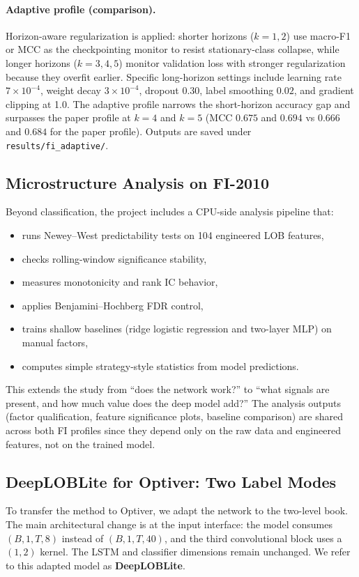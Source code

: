 \documentclass[11pt]{article}
\begin{document}
\paragraph{Adaptive profile (comparison).} Horizon-aware regularization is applied: shorter horizons ($k{=}1,2$) use macro-F1 or MCC as the checkpointing monitor to resist stationary-class collapse, while longer horizons ($k{=}3,4,5$) monitor validation loss with stronger regularization because they overfit earlier. Specific long-horizon settings include learning rate $7\times10^{-4}$, weight decay $3\times10^{-4}$, dropout $0.30$, label smoothing $0.02$, and gradient clipping at 1.0. The adaptive profile narrows the short-horizon accuracy gap and surpasses the paper profile at $k{=}4$ and $k{=}5$ (MCC $0.675$ and $0.694$ vs $0.666$ and $0.684$ for the paper profile). Outputs are saved under \texttt{results/fi\_adaptive/}.

\subsection{Microstructure Analysis on FI-2010}
Beyond classification, the project includes a CPU-side analysis pipeline that:
\begin{itemize}[leftmargin=*]
    \item runs Newey--West predictability tests on 104 engineered LOB features,
    \item checks rolling-window significance stability,
    \item measures monotonicity and rank IC behavior,
    \item applies Benjamini--Hochberg FDR control,
    \item trains shallow baselines (ridge logistic regression and two-layer MLP) on manual factors,
    \item computes simple strategy-style statistics from model predictions.
\end{itemize}

This extends the study from ``does the network work?'' to ``what signals are present, and how much value does the deep model add?'' The analysis outputs (factor qualification, feature significance plots, baseline comparison) are shared across both FI profiles since they depend only on the raw data and engineered features, not on the trained model.

\subsection{DeepLOBLite for Optiver: Two Label Modes}
To transfer the method to Optiver, we adapt the network to the two-level book. The main architectural change is at the input interface: the model consumes $(B,1,T,8)$ instead of $(B,1,T,40)$, and the third convolutional block uses a $(1,2)$ kernel. The LSTM and classifier dimensions remain unchanged. We refer to this adapted model as \textbf{DeepLOBLite}.
\end{document}
